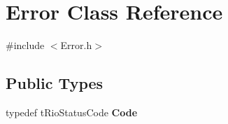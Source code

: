 \hypertarget{classError}{
\section{Error Class Reference}
\label{classError}
}


{\ttfamily \#include $<$Error.h$>$}

\subsection*{Public Types}
\begin{DoxyCompactItemize}
\item 
\hypertarget{classError_ad0ca95bfda335aaedd0d6c5c52b5d95b}{
typedef tRioStatusCode {\bfseries Code}}
\label{classError_ad0ca95bfda335aaedd0d6c5c52b5d95b}

\end{DoxyCompactItemize}
